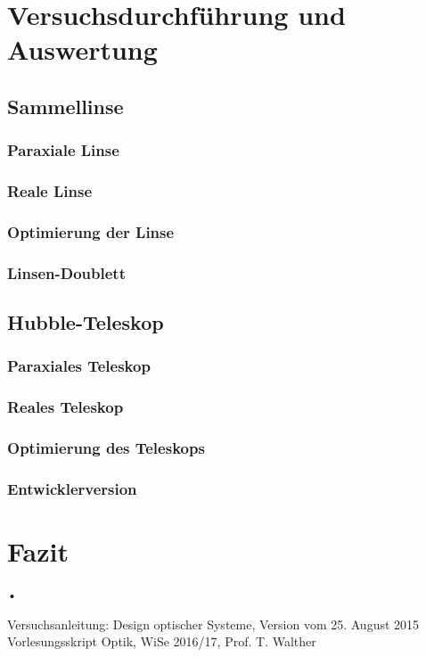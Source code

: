 \documentclass[twoside,colorback,accentcolor=tud4c,11pt]{tudreport}
\begin{document}
\chapter{Versuchsdurchführung und Auswertung}
\section{Sammellinse}
\subsection{Paraxiale Linse}
\subsection{Reale Linse}
\subsection{Optimierung der Linse}
\subsection{Linsen-Doublett}
\section{Hubble-Teleskop}
\subsection{Paraxiales Teleskop}
\subsection{Reales Teleskop}
\subsection{Optimierung des Teleskops}
\subsection{Entwicklerversion}
\chapter{Fazit}	
•
\renewcommand{\bibname}{Literatur}
\begin{thebibliography}{0}
 Versuchsanleitung: Design optischer Systeme, Version vom 25. August 2015
 Vorlesungsskript Optik, WiSe 2016/17, Prof. T. Walther

\end{thebibliography}
\end{document}
